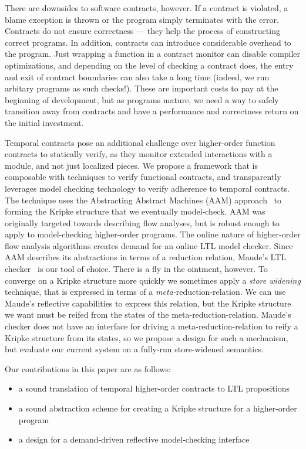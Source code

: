 \documentclass[preprint,onecolumn,9pt]{sigplanconf} %
\begin{document}
There are downsides to software contracts, however.
%
If a contract is violated, a blame exception is thrown or the program simply terminates with the error.
%
Contracts do not ensure correctness --- they help the process of constructing correct programs.
%
In addition, contracts can introduce considerable overhead to the program.
%
Just wrapping a function in a contract monitor can disable compiler optimizations, and depending on the level of checking a contract does, the entry and exit of contract boundaries can also take a long time (indeed, we run arbitary programs as such checks!).
%
These are important costs to pay at the beginning of development, but as programs mature, we need a way to safely transition away from contracts and have a performance and correctness return on the initial investment.

Temporal contracts pose an additional challenge over higher-order function contracts to statically verify, as they monitor extended interactions with a module, and not just localized pieces.
%
We propose a framework that is composable with techniques to verify functional contracts, and transparently leverages model checking technology to verify adherence to temporal contracts.
%
The technique uses the Abstracting Abstract Machines (AAM) approach~\citet{dvanhorn:VanHorn2010Abstracting} to forming the Kripke structure that we eventually model-check.
%
AAM was originally targeted towards describing flow analyses, but is robust enough to apply to model-checking higher-order programs.
%
The online nature of higher-order flow analysis algorithms creates demand for an online LTL model checker.
%
Since AAM describes its abstractions in terms of a reduction relation, Maude's LTL checker~\citep{ianjohnson:EMSltl_2002} is our tool of choice.
%
There is a fly in the ointment, however.
%
To converge on a Kripke structure more quickly we sometimes apply a \emph{store widening} technique, that is expressed in terms of a \emph{meta-}reduction-relation.
%
We can use Maude's reflective capabilities to express this relation, but the Kripke structure we want must be reifed from the states of the meta-reduction-relation.
%
Maude's checker does not have an interface for driving a meta-reduction-relation to reify a Kripke structure from its states, so we propose a design for such a mechanism, but evaluate our current system on a fully-run store-widened semantics.

Our contributions in this paper are as follows:
\begin{itemize}
 \item{a sound translation of temporal higher-order contracts to LTL propositions}
 \item{a sound abstraction scheme for creating a Kripke structure for a higher-order program}
 \item{a design for a demand-driven reflective model-checking interface}
\end{itemize}
\end{document}
